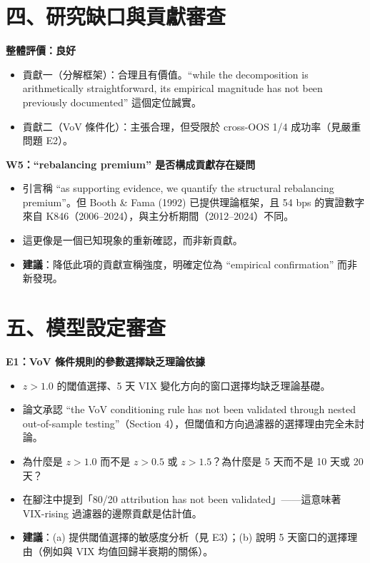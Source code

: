 \documentclass[12pt,a4paper]{article}
\begin{document}
\section*{四、研究缺口與貢獻審查}

\textcolor{okgreen}{\textbf{整體評價：良好}}

\begin{itemize}[leftmargin=2em]
\item 貢獻一（分解框架）：合理且有價值。``while the decomposition is arithmetically straightforward, its empirical magnitude has not been previously documented'' 這個定位誠實。
\item 貢獻二（VoV 條件化）：主張合理，但受限於 cross-OOS 1/4 成功率（見嚴重問題 E2）。
\end{itemize}

\textcolor{warncolor}{\textbf{W5：``rebalancing premium'' 是否構成貢獻存在疑問}}

\begin{itemize}[leftmargin=2em]
\item 引言稱 ``as supporting evidence, we quantify the structural rebalancing premium''。但 Booth \& Fama (1992) 已提供理論框架，且 54 bps 的實證數字來自 K846（2006--2024），與主分析期間（2012--2024）不同。
\item 這更像是一個已知現象的重新確認，而非新貢獻。
\item \textbf{建議}：降低此項的貢獻宣稱強度，明確定位為 ``empirical confirmation'' 而非新發現。
\end{itemize}

\section*{五、模型設定審查}

\textcolor{errorred}{\textbf{E1：VoV 條件規則的參數選擇缺乏理論依據}}

\begin{itemize}[leftmargin=2em]
\item $z > 1.0$ 的閾值選擇、5 天 VIX 變化方向的窗口選擇均缺乏理論基礎。
\item 論文承認 ``the VoV conditioning rule has not been validated through nested out-of-sample testing''（Section 4），但閾值和方向過濾器的選擇理由完全未討論。
\item 為什麼是 $z > 1.0$ 而不是 $z > 0.5$ 或 $z > 1.5$？為什麼是 5 天而不是 10 天或 20 天？
\item 在腳注中提到「80/20 attribution has not been validated」——這意味著 VIX-rising 過濾器的邊際貢獻是估計值。
\item \textbf{建議}：(a) 提供閾值選擇的敏感度分析（見 E3）；(b) 說明 5 天窗口的選擇理由（例如與 VIX 均值回歸半衰期的關係）。
\end{itemize}
\end{document}
